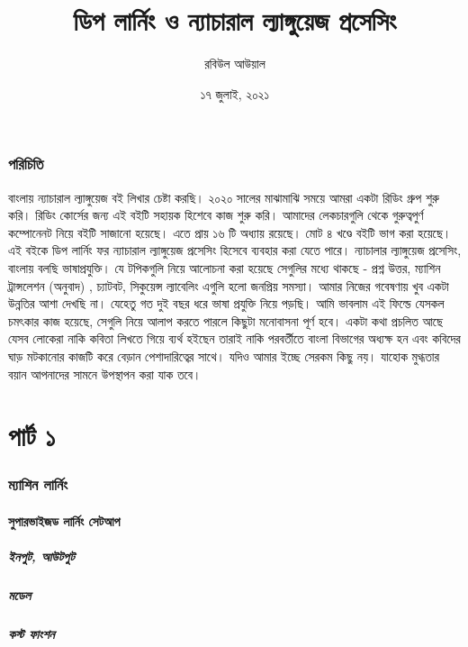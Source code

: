 \documentclass{article}[book]
\title{ডিপ লার্নিং ও ন্যাচারাল ল্যাঙ্গুয়েজ প্রসেসিং}
\author{রবিউল আউয়াল}
\date{১৭ জুলাই, ২০২১}
\begin{document}
\maketitle

\tableofcontents


\section{পরিচিতি }
বাংলায় ন্যাচারাল ল্যাঙ্গুয়েজ  বই লিখার চেষ্টা করছি। 
২০২০ সালের মাঝামাঝি সময়ে আমরা একটা রিডিং গ্রুপ শুরু করি। রিডিং কোর্সের জন্য এই বইটি সহায়ক হিশেবে কাজ শুরু করি।
আমাদের লেকচারগুলি থেকে গুরুত্বপুর্ণ কম্পোনেনট নিয়ে বইটি সাজানো হয়েছে। এতে প্রায় ১৬ টি অধ্যায় রয়েছে। মোট ৪ খণ্ডে বইটি ভাগ করা হয়েছে।   
এই বইকে ডিপ লার্নিং ফর ন্যাচারাল ল্যাঙ্গুয়েজ প্রসেসিং হিসেবে ব্যবহার করা যেতে পারে। 
ন্যাচালার ল্যাঙ্গুয়েজ প্রসেসিং, বাংলায় বলছি ভাষাপ্রযুক্তি। যে টপিকগুলি নিয়ে আলোচনা করা হয়েছে সেগুলির মধ্যে থাকছে - প্রশ্ন উত্তর, ম্যাশিন ট্রান্সলেশন (অনুবাদ) , চ্যাটবট, সিকুয়েন্স ল্যাবেলিং এগুলি হলো জনপ্রিয় সমস্যা। আমার নিজের গবেষণায় খুব একটা উন্নতির আশা দেখছি না। যেহেতু গত দুই বছর ধরে ভাষা প্রযুক্তি নিয়ে পড়ছি। আমি ভাবলাম এই ফিল্ডে যেসকল চমৎকার কাজ হয়েছে, সেগুলি নিয়ে 
আলাপ করতে পারলে কিছুটা মনোবাসনা পূর্ণ হবে। একটা কথা প্রচলিত আছে যেসব লোকেরা নাকি কবিতা লিখতে গিয়ে ব্যর্থ হইছেন তারাই নাকি পরবর্তীতে বাংলা বিভাগের অধ্যক্ষ হন এবং কবিদের ঘাড় মটকানোর 
কাজটি করে বেড়ান পেশাদারিত্বের সাথে। যদিও আমার ইচ্ছে সেরকম কিছু নয়। যাহোক মুগ্ধতার বয়ান আপনাদের সামনে উপস্থাপন করা যাক তবে।

 \part{পার্ট ১} 
\section{ম্যাশিন লার্নিং}
\subsection{সুপারভাইজড লার্নিং সেটআপ}
\subsubsection{ইনপুট, আউটপুট}
\subsubsection{মডেল}
\subsubsection{কস্ট ফাংশন}
\end{document}
